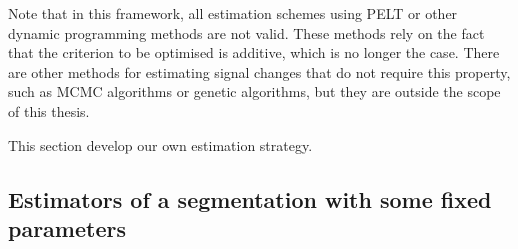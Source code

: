 Note that in this framework, all estimation schemes using PELT or other dynamic programming methods are not valid. These methods rely on the fact that the criterion to be optimised is additive, which is no longer the case. There are other methods for estimating signal changes that do not require this property, such as MCMC algorithms \citep{Lavielle2001} or genetic algorithms, but they are outside the scope of this thesis. 

This section develop our own estimation strategy.



\subsection{Estimators of a segmentation with some fixed parameters}

